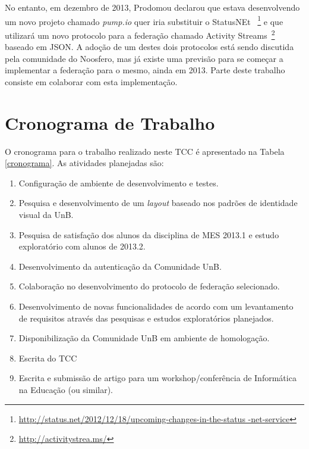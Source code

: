 No entanto, em dezembro de 2013, Prodomou declarou que estava desenvolvendo
um novo projeto chamado \textit{pump.io} quer iria substituir o StatusNEt
~\footnote{\url{http://status.net/2012/12/18/upcoming-changes-in-the-status
-net-service}} e que utilizará um novo protocolo para a federação chamado
Activity Streams~\footnote{\url{http://activitystrea.ms/}} baseado em JSON.
A adoção de um destes dois protocolos está sendo discutida pela comunidade do
Noosfero, mas já existe uma previsão para se começar a implementar a federação
para o mesmo, ainda em 2013. Parte deste trabalho consiste em colaborar com esta
implementação.

\section{Cronograma de Trabalho}

O cronograma para o trabalho realizado neste TCC é apresentado na Tabela
\ref{cronograma}. As atividades planejadas são:

\begin{enumerate}
	\item Configuração de ambiente de desenvolvimento e testes.
	\item Pesquisa e desenvolvimento de um \textit{layout} baseado nos
	padrões de identidade visual da UnB.
	\item Pesquisa de satisfação dos alunos da disciplina de MES 2013.1 e
	estudo exploratório com alunos de 2013.2.
	\item Desenvolvimento da autenticação da Comunidade UnB.
	\item Colaboração no desenvolvimento do protocolo de federação
	selecionado.
	\item Desenvolvimento de novas funcionalidades de acordo com um
	levantamento de requisitos através das pesquisas e estudos exploratórios
	planejados.
	\item Disponibilização da Comunidade UnB em ambiente de homologação.
	\item Escrita do TCC
	\item Escrita e submissão de artigo para um workshop/conferência de
	Informática na Educação (ou similar).
\end{enumerate}

